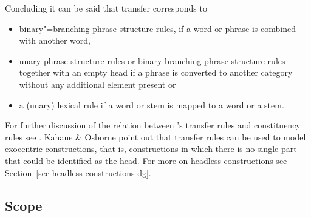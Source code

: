 \pagebreak
Concluding it can be said that transfer corresponds to 
\begin{itemize}
\item binary"=branching phrase structure rules,
if a word or phrase is combined with another word, 
\item unary phrase structure rules or binary branching phrase structure rules together with an empty head if
  a phrase is converted to another category without any additional element present or
\item a (unary) lexical rule if a word or stem is mapped to a word or a stem.
\end{itemize}
For further discussion of the relation between \tes's transfer rules and constituency rules see
. Kahane \& Osborne point out that transfer rules can be used
to model exocentric constructions, that is, constructions in which there is no single part that
could be identified as the head. For more on headless constructions see Section~\ref{sec-headless-constructions-dg}.

\subsection{Scope}

